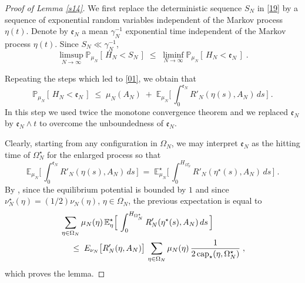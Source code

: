 \documentclass[reqno]{amsart}
\begin{document}
\begin{proof}[Proof of Lemma \ref{s14}]
We first replace the deterministic sequence $S_N$ in \eqref{19} by a
sequence of exponential random variables independent of the Markov
process $\eta(t)$. Denote by ${{\mathfrak e}}_N$ a mean $\gamma^{-1}_N$
exponential time independent of the Markov process $\eta(t)$. Since
$S_N \ll \gamma^{-1}_N$, 
\begin{equation}
\label{21}
\limsup_{N\to\infty} {{\mathbb P}} _{\mu_N} [\, H_N < S_N \,] \;\le\;
\liminf_{N\to\infty} {{\mathbb P}} _{\mu_N} [\, H_N < {{\mathfrak e}}_N \,]\;.
\end{equation}

Repeating the steps which led to \eqref{01}, we obtain that
\begin{equation*}
{{\mathbb P}}_{\mu_N} [\, H_N < {{\mathfrak e}}_N \,] \;\le\; \mu_N(A_N) \;+\;
{{\mathbb E}}_{\mu_N} \Big[\, \int_0^{{{\mathfrak e}}_N} R'_N(\eta(s), A_N) \, ds \, \Big
] \;.
\end{equation*}
In this step we used twice the monotone convergence theorem and we
replaced ${{\mathfrak e}}_N$ by ${{\mathfrak e}}_N \wedge t$ to overcome the unboundedness
of ${{\mathfrak e}}_N$.

Clearly, starting from any configuration in $\Omega_N$, we may
interpret ${{\mathfrak e}}_N$ as the hitting time of $\Omega^\star_N$ for the
enlarged process so that
\begin{equation*}
{{\mathbb E}}_{\mu_N} \Big[\, \int_0^{{{\mathfrak e}}_N} R'_N(\eta(s), A_N) \, ds \,
\Big] \;=\; {{\mathbb E}}^\star_{\mu_N} \Big[\, \int_0^{H_{\Omega^\star_N}} 
R'_N(\eta^\star(s), A_N) \, ds \, \Big] \;.
\end{equation*}
By \cite[Proposition A.2]{bl7}, since the equilibrium potential is
bounded by $1$ and since $\nu^\star_N (\eta) = (1/2) \nu_N(\eta)$,
$\eta\in\Omega_N$, the previous expectation is equal to
\begin{equation*}
\begin{split}
& \sum_{\eta\in \Omega_N} \mu_N(\eta) \, {{\mathbb E}}^\star_{\eta}
\Big[\, \int_0^{H_{\Omega^\star_N}} 
R'_N(\eta^\star(s), A_N) \, ds \, \Big] \\
&\quad \;\le \; E_{\nu_N} \big[R'_N(\eta, A_N)\big]\,
\sum_{\eta\in \Omega_N} \mu_N(\eta) \,
\frac{1} {2\, {{\rm cap}}_\star (\eta, \Omega^\star_N)}\;,
\end{split}
\end{equation*}
which proves the lemma.
\end{proof}
\end{document}
